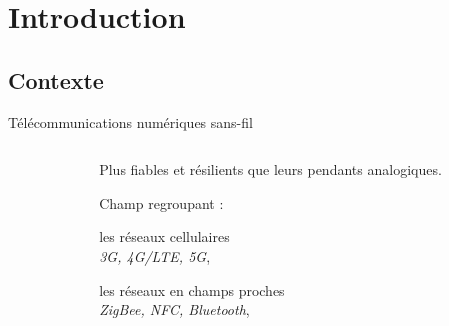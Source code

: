 \documentclass[../main.tex]{subfiles}
\begin{document}
\section{Introduction}

\subsection{Contexte}

\begin{frame}{Télécommunications numériques sans-fil}
  \begin{columns}
    \begin{column}{.4\linewidth}
      \begin{center}
      \end{center}
    \end{column}
    \begin{column}{.55\linewidth}
      \small
      \begin{overlayarea}{\linewidth}{.6\textheight}
        \begin{ctrlitemize}{1em}
          \item Plus fiables et résilients que leurs pendants analogiques.
          \item<2-> Champ regroupant :
          \begin{ctrlitemize}{1ex}
            \scriptsize
            \item<2-> les réseaux cellulaires \\\hspace{1em} \textit{3G, 4G/LTE, 5G},
            \item<3-> les réseaux en champs proches \\\hspace{1em} \textit{ZigBee, NFC, Bluetooth},
          \end{ctrlitemize}
        \end{ctrlitemize}
      \end{overlayarea}
    \end{column}
  \end{columns}
\end{frame}
\end{document}
